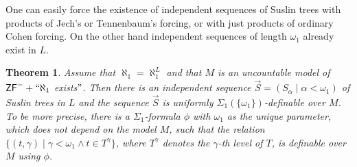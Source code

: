 \documentclass[a4paper,11pt]{article}
\newtheorem{theorem}{Theorem}[section]
\newcommand{\ZF}{\mathsf{ZF}}
\begin{document}
One can easily force the existence of independent sequences of Suslin trees with products of Jech's or Tennenbaum's forcing, or with just products of ordinary Cohen forcing. On the other hand independent sequences of length $\omega_1$ already exist in $L$. 

\begin{theorem}\label{DefinitionIndependentSequence}
Assume that $\aleph_1= \aleph_1^L$ and that $M$ is an uncountable model of $\ZF^{-} + ``\aleph_1$ exists$"$.  Then there is an independent sequence $\vec{S} = ( S_{\alpha} \mid \alpha < \omega_1)$ of Suslin trees in $L$ and the sequence $\vec{S}$ is uniformly $\Sigma_1 ( \{ \omega_1 \} )$-definable over $M$. To be more precise,
there is a $\Sigma_1$-formula $\phi$  with $\omega_1$ as the unique parameter, which does not depend on the model $M$, such that
the relation $\{ (t,\gamma) \mid \gamma < \omega_1 \land t \in T^{\gamma}  \}$, where $T^{\gamma}$ denotes the $\gamma$-th level of $T$, is definable over $M$ using $\phi$. 
\end{theorem}
\end{document}
